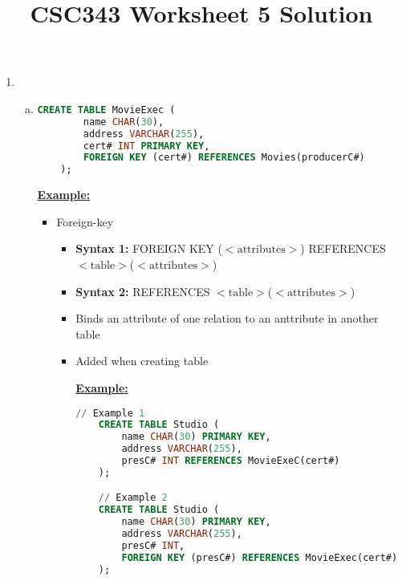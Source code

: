 \documentclass[12pt]{article}
\begin{document}
\title{CSC343 Worksheet 5 Solution}
\maketitle

\begin{enumerate}[1.]
    \item

    \begin{enumerate}[a)]
        \item

    \begin{lstlisting}[language=SQL]
    CREATE TABLE MovieExec (
        name CHAR(30),
        address VARCHAR(255),
        cert# INT PRIMARY KEY,
        FOREIGN KEY (cert#) REFERENCES Movies(producerC#)
    );
    \end{lstlisting}

        \bigskip

        \underline{\textbf{Example:}}

        \bigskip

        \begin{itemize}
            \item Foreign-key
            \begin{itemize}
                \item \textbf{Syntax 1:} FOREIGN KEY ($<\text{attributes}>$) REFERENCES $<\text{table}>$($<\text{attributes}>$)
                \item \textbf{Syntax 2:} REFERENCES $<\text{table}>$($<\text{attributes}>$)
                \item Binds an attribute of one relation to an anttribute in another table
                \item Added when creating table

                \bigskip

                \underline{\textbf{Example:}}

                \bigskip

    \begin{lstlisting}[language=SQL]
    // Example 1
    CREATE TABLE Studio (
        name CHAR(30) PRIMARY KEY,
        address VARCHAR(255),
        presC# INT REFERENCES MovieExeC(cert#)
    );

    // Example 2
    CREATE TABLE Studio (
        name CHAR(30) PRIMARY KEY,
        address VARCHAR(255),
        presC# INT,
        FOREIGN KEY (presC#) REFERENCES MovieExec(cert#)
    );
    \end{lstlisting}
            \end{itemize}
        \end{itemize}
    \end{enumerate}
\end{enumerate}
\end{document}
